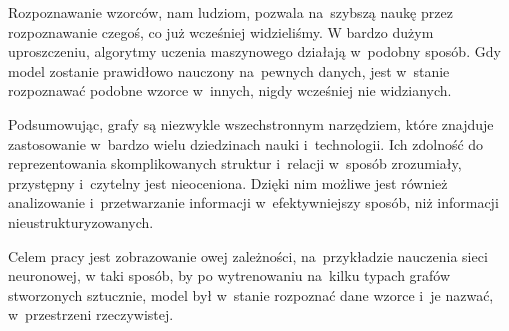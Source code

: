 Rozpoznawanie wzorców, nam ludziom, pozwala na~szybszą naukę przez rozpoznawanie czegoś, co już wcześniej widzieliśmy.
W bardzo dużym uproszczeniu, algorytmy uczenia maszynowego działają w~podobny sposób.
Gdy model zostanie prawidłowo nauczony na~pewnych danych,
jest w~stanie rozpoznawać podobne wzorce w~innych, nigdy wcześniej nie widzianych.

Podsumowując, grafy są niezwykle wszechstronnym narzędziem,
które znajduje zastosowanie w~bardzo wielu dziedzinach nauki i~technologii.
Ich zdolność do reprezentowania skomplikowanych struktur i~relacji w~sposób zrozumiały, przystępny i~czytelny jest nieoceniona.
Dzięki nim możliwe jest również analizowanie i~przetwarzanie informacji w~efektywniejszy sposób,
niż informacji nieustrukturyzowanych. 

Celem pracy jest zobrazowanie owej zależności, na~przykładzie nauczenia sieci neuronowej,
w taki sposób, by po wytrenowaniu na~kilku typach grafów stworzonych sztucznie,
model był w~stanie rozpoznać dane wzorce i~je nazwać, w~przestrzeni rzeczywistej.